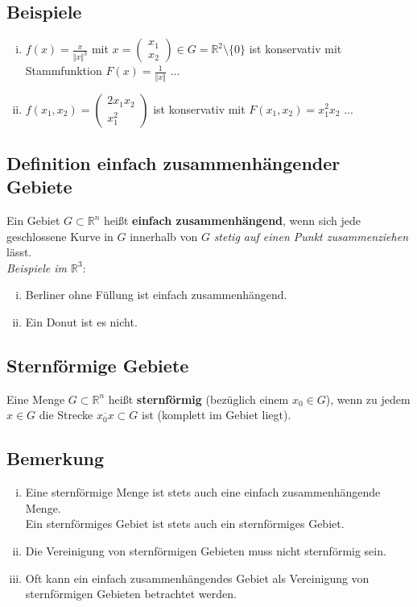 \documentclass[11pt,a4paper]{book}
\newcommand {\R}	{\mathbb{R}}
\newcommand {\Rn}	{\mathbb{R}^n}
\newcommand {\Rzwei}	{\mathbb{R}^2}
\newcommand{\1}    	{\mathbbm{1}}
\begin{document}
\subsection{Beispiele}
\begin{enumerate}[(i)]
	\item \(f(x) = \frac{x}{\Vert x \Vert^3}\) mit \(x = \left(\begin{array}{c} x_1 \\ x_2 \end{array}\right) \in G = \Rzwei \setminus \{0\}\) ist konservativ mit Stammfunktion \(F(x) = \frac{1}{\Vert x \Vert}\) ...
	\item \(f(x_1, x_2) = \left( \begin{array}{c} 2x_1x_2 \\ x_1^2 \end{array}\right)\) ist konservativ mit \(F(x_1,x_2) = x_1^2x_2\) ...
\end{enumerate}

\subsection{Definition einfach zusammenhängender Gebiete}
Ein Gebiet \(G \subset \Rn\) heißt \textbf{einfach zusammenhängend}, wenn sich jede geschlossene Kurve in \(G\) innerhalb von \(G\) \textit{stetig auf einen Punkt zusammenziehen} lässt.\\
\textit{Beispiele im \(\R^3\)}:
\begin{enumerate}[(i)]
	\item Berliner ohne Füllung ist einfach zusammenhängend.
	\item Ein Donut ist es nicht.
\end{enumerate}

\subsection{Sternförmige Gebiete}
Eine Menge \(G \subset \Rn\) heißt \textbf{sternförmig} (bezüglich einem \(x_0 \in G\)), wenn zu jedem \(x \in G\) die Strecke \(\overline{x_0 x} \subset G\) ist (komplett im Gebiet liegt).

\subsection{Bemerkung}
\begin{enumerate}[(i)]
	\item Eine sternförmige Menge ist stets auch eine einfach zusammenhängende Menge.\\
	Ein sternförmiges Gebiet ist stets auch ein sternförmiges Gebiet.
	\item Die Vereinigung von sternförmigen Gebieten muss nicht sternförmig sein.
	\item Oft kann ein einfach zusammenhängendes Gebiet als Vereinigung von sternförmigen Gebieten betrachtet werden.
\end{enumerate}
\end{document}
